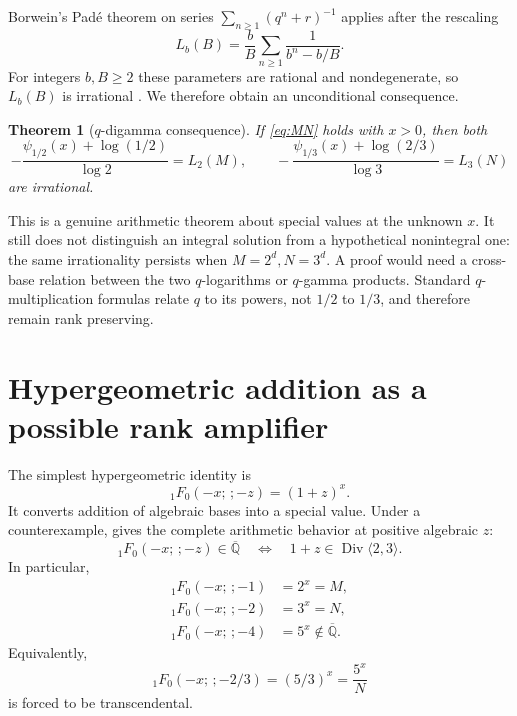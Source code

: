\documentclass[11pt]{article}
\numberwithin{equation}{section}
\newtheorem{theorem}{Theorem}[section]
\theoremstyle{definition}
\theoremstyle{remark}
\newcommand{\Qbar}{\overline{\mathbb{Q}}}
\newcommand{\Div}{\operatorname{Div}}
\begin{document}
Borwein's Pad\'e theorem on series $\sum_{n\ge1}(q^n+r)^{-1}$ applies after the rescaling
\begin{equation}
 L_b(B)=\frac{b}{B}\sum_{n\ge1}\frac1{b^n-b/B}.
 \label{eq:Borwein-rescale}
\end{equation}
For integers $b,B\ge2$ these parameters are rational and nondegenerate, so $L_b(B)$ is irrational \cite{Borwein1992}.  We therefore obtain an unconditional consequence.

\begin{theorem}[$q$-digamma consequence]
\label{thm:qdigamma-irr}
If \eqref{eq:MN} holds with $x>0$, then both
\begin{equation}
 -\frac{\psi_{1/2}(x)+\log(1/2)}{\log2}=L_2(M),\qquad
 -\frac{\psi_{1/3}(x)+\log(2/3)}{\log3}=L_3(N)
 \label{eq:two-qdigamma}
\end{equation}
are irrational.
\end{theorem}

This is a genuine arithmetic theorem about special values at the unknown $x$.  It still does not distinguish an integral solution from a hypothetical nonintegral one: the same irrationality persists when $M=2^d,N=3^d$.  A proof would need a cross-base relation between the two $q$-logarithms or $q$-gamma products.  Standard $q$-multiplication formulas relate $q$ to its powers, not $1/2$ to $1/3$, and therefore remain rank preserving.

\section{Hypergeometric addition as a possible rank amplifier}
\label{sec:hypergeometric}

The simplest hypergeometric identity is
\begin{equation}
 {}_1F_0(-x;\,; -z)=(1+z)^x.
 \label{eq:1F0}
\end{equation}
It converts addition of algebraic bases into a special value.  Under a counterexample,  gives the complete arithmetic behavior at positive algebraic $z$:
\begin{equation}
 {}_1F_0(-x;\,;-z)\in\Qbar
 \quad\Longleftrightarrow\quad
 1+z\in\Div\langle2,3\rangle.
 \label{eq:hyper-spectrum}
\end{equation}
In particular,
\begin{align}
 {}_1F_0(-x;\,;-1)&=2^x=M,\label{eq:F0-2}\\
 {}_1F_0(-x;\,;-2)&=3^x=N,\label{eq:F0-3}\\
 {}_1F_0(-x;\,;-4)&=5^x\notin\Qbar.\label{eq:F0-5}
\end{align}
Equivalently,
\begin{equation}
 {}_1F_0(-x;\,;-2/3)=(5/3)^x=\frac{5^x}{N}
 \label{eq:additive-bridge}
\end{equation}
is forced to be transcendental.
\end{document}
